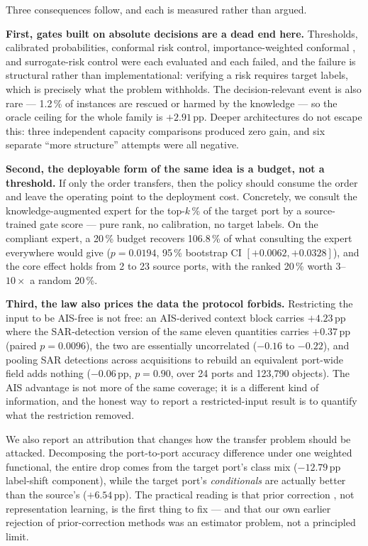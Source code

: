 \documentclass[journal]{IEEEtran}
\begin{document}
Three consequences follow, and each is measured rather than argued.

\textbf{First, gates built on absolute decisions are a dead end here.} Thresholds, calibrated
probabilities, conformal risk control, importance-weighted conformal
\cite{tibshirani2019conformal,angelopoulos2024riskcontrol}, and surrogate-risk control were each
evaluated and each failed, and the failure is structural rather than implementational: verifying a
risk requires target labels, which is precisely what the problem withholds. The decision-relevant
event is also rare --- 1.2\,\% of instances are rescued or harmed by the knowledge --- so the oracle
ceiling for the whole family is $+2.91$\,pp. Deeper architectures do not escape this: three
independent capacity comparisons produced zero gain, and six separate ``more structure'' attempts were
all negative.

\textbf{Second, the deployable form of the same idea is a budget, not a threshold.} If only the order
transfers, then the policy should consume the order and leave the operating point to the deployment
cost. Concretely, we consult the knowledge-augmented expert for the top-$k$\,\% of the target port by a
source-trained gate score --- pure rank, no calibration, no target labels. On the compliant expert, a
20\,\% budget recovers 106.8\,\% of what consulting the expert everywhere would give
($p = 0.0194$, 95\,\% bootstrap CI $[+0.0062, +0.0328]$), and the core effect holds from 2 to 23 source
ports, with the ranked 20\,\% worth $3$--$10\times$ a random 20\,\%.

\textbf{Third, the law also prices the data the protocol forbids.} Restricting the input to be AIS-free
is not free: an AIS-derived context block carries $+4.23$\,pp where the SAR-detection version of the
same eleven quantities carries $+0.37$\,pp (paired $p = 0.0096$), the two are essentially uncorrelated
($-0.16$ to $-0.22$), and pooling SAR detections across acquisitions to rebuild an equivalent port-wide
field adds nothing ($-0.06$\,pp, $p = 0.90$, over 24 ports and 123{,}790 objects). The AIS advantage is
not more of the same coverage; it is a different kind of information, and the honest way to report a
restricted-input result is to quantify what the restriction removed.

We also report an attribution that changes how the transfer problem should be attacked. Decomposing the
port-to-port accuracy difference under one weighted functional, the entire drop comes from the target
port's class mix ($-12.79$\,pp label-shift component), while the target port's \emph{conditionals} are
actually better than the source's ($+6.54$\,pp). The practical reading is that prior correction
\cite{saerens2002adjusting,lipton2018bbse}, not representation learning, is the first thing to fix ---
and that our own earlier rejection of prior-correction methods was an estimator problem, not a
principled limit.
\end{document}
